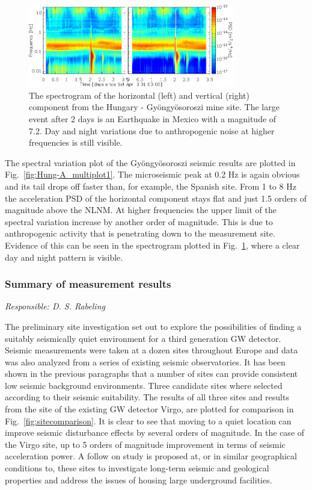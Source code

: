 \begin{figure}[h]
	\begin{center}
		\includegraphics[width=0.8\textwidth]{./Sec_SiteInfra/Figures/Hung-A_multiplot2}
		\caption{The spectrogram of the horizontal (left) and vertical (right) component from the Hungary - Gy\"ongy\"osoroszi mine site. The large event after 2 days is an Earthquake in Mexico with a magnitude of 7.2. Day and night variations due to anthropogenic noise at higher frequencies is still visible.}
		\label{fig:Hung-A_multiplot2}
	\end{center}
\end{figure}
The spectral variation plot of the Gy\"ongy\"osoroszi seismic results are plotted in Fig.~\ref{fig:Hung-A_multiplot1}. The microseismic peak at 0.2 Hz is again obvious and its tail drops off faster than, for example, the Spanish site. From 1 to 8 Hz the acceleration PSD of the horizontal component stays flat and just 1.5 orders of magnitude above the NLNM. At higher frequencies the upper limit of the spectral variation increase by another order of magnitude. This is due to anthropogenic activity that is penetrating down to the measurement site. Evidence of this can be seen in the spectrogram plotted in Fig.~\ref{fig:Hung-A_multiplot2}, where a clear day and night pattern is visible.
\FloatBarrier
\subsubsection{Summary of measurement results}
\emph{
Responsible:  D. S. Rabeling  \\
}

The preliminary site investigation set out to explore the possibilities of finding a suitably seismically quiet environment for a third generation GW detector. Seismic measurements were taken at a dozen sites throughout Europe and data was also analyzed from a series of existing seismic observatories. It has been shown in the previous paragraphs that a number of sites can provide consistent low seismic background environments. Three candidate sites where selected according to their seismic suitability. The results of all three sites and results from the site of the existing GW detector Virgo, are plotted for comparison in Fig.~\ref{fig:sitecomparison}. It is clear to see that moving to a quiet location can improve seismic disturbance effects by several orders of magnitude. In the case of the Virgo site, up to 5 orders of magnitude improvement in terms of seismic acceleration power. A follow on study is proposed at, or in similar geographical conditions to, these sites to investigate long-term seismic and geological properties and address the issues of housing large underground facilities. 

